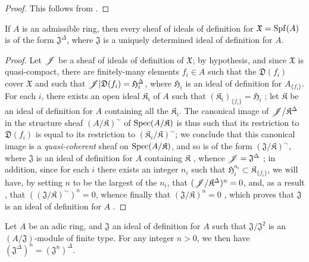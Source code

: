 \begin{proof}
This follows from .
\end{proof}

\begin{proposition}[10.3.5]
\label{I.10.3.5}
If $A$ is an admissible ring, then every sheaf of ideals of definition for $\mathfrak{X}=\operatorname{Spf}(A)$ is of the form $\mathfrak{J}^\Delta$, where $\mathfrak{J}$ is a uniquely determined ideal of definition for $A$.
\end{proposition}

\begin{proof}
Let $\mathscr{J}$ be a sheaf of ideals of definition of $\mathfrak{X}$; by hypothesis, and since $\mathfrak{X}$ is quasi-compact, there are finitely-many elements $f_i\in A$ such that the $\mathfrak{D}(f_i)$ cover $\mathfrak{X}$ and such that $\mathscr{J}|\mathfrak{D}(f_i)=\mathfrak{H}_i^\Delta$, where $\mathfrak{H}_i$ is an ideal of definition for $A_{\{f_i\}}$.
For each $i$, there exists an open ideal $\mathfrak{K}_i$ of $A$ such that $(\mathfrak{K}_i)_{\{f_i\}}=\mathfrak{H}_i$ ; let $\mathfrak{K}$ be an ideal of definition for $A$ containing all the $\mathfrak{K}_i$.
The canonical image of $\mathscr{J}/\mathfrak{K}^\Delta$ in the structure sheaf $(A/\mathfrak{K})^\sim$ of $\operatorname{Spec}(A/\mathfrak{K})$  is thus such that its restriction to $\mathfrak{D}(f_i)$ is equal to its restriction to $(\mathfrak{K}_i/\mathfrak{K})^\sim$;
we conclude that this canonical image is a \emph{quasi-coherent} sheaf on $\operatorname{Spec}(A/\mathfrak{K})$, and so is of the form $(\mathfrak{J}/\mathfrak{K})^\sim$, where $\mathfrak{J}$ is an ideal of definition for $A$ containing $\mathfrak{K}$ , whence $\mathscr{J}=\mathfrak{J}^\Delta$ ;
in addition, since for each $i$ there exists an integer $n_i$ such that $\mathfrak{H}_i^{n_i}\subset\mathfrak{K}_{\{f_i\}}$, we will have, by setting $n$ to be the largest of the $n_i$, that $(\mathscr{J}/\mathfrak{K}^\Delta)^n=0$, and, as a result , that $((\mathfrak{J}/\mathfrak{K})^\sim)^n=0$, whence finally that $(\mathfrak{J}/\mathfrak{K})^n=0$ , which proves that $\mathfrak{J}$ is an ideal of definition for $A$ .
\end{proof}

\begin{proposition}[10.3.6]
\label{I.10.3.6}
Let $A$ be an adic ring, and $\mathfrak{J}$ an ideal of definition for $A$ such that $\mathfrak{J}/\mathfrak{J}^2$ is an $(A/\mathfrak{J})$-module of finite type. For any integer $n>0$, we then have $(\mathfrak{J}^\Delta)^n=(\mathfrak{J}^n)^\Delta$.
\end{proposition}

